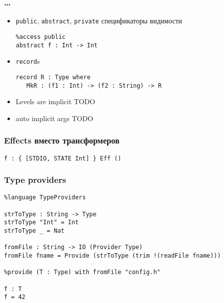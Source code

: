 \begin{frame}[fragile]
   \frametitle{\dots}
   \begin{itemize}
   \item \texttt{\color{kwcolor}public}, \texttt{\color{kwcolor}abstract},
         \texttt{\color{kwcolor}private} спецификаторы видимости
      \begin{lstlisting}
%access public
abstract f : Int -> Int
      \end{lstlisting}
   \item \texttt{\color{kwcolor}record}s
      \begin{lstlisting}
record R : Type where
   MkR : (f1 : Int) -> (f2 : String) -> R
      \end{lstlisting}
   \item Levels are implicit
      TODO
   \item auto implicit args
      TODO
   \end{itemize}
\end{frame}

\begin{frame}[fragile]
   \frametitle{Effects вместо трансформеров}%
   \begin{lstlisting}
f : { [STDIO, STATE Int] } Eff ()
   \end{lstlisting}
\end{frame}

\begin{frame}[fragile]
   \frametitle{Type providers} %
   \begin{lstlisting}
%language TypeProviders

strToType : String -> Type
strToType "Int" = Int
strToType _ = Nat

fromFile : String -> IO (Provider Type)
fromFile fname = Provide (strToType (trim !(readFile fname)))

%provide (T : Type) with fromFile "config.h"

f : T
f = 42
   \end{lstlisting}
\end{frame}

